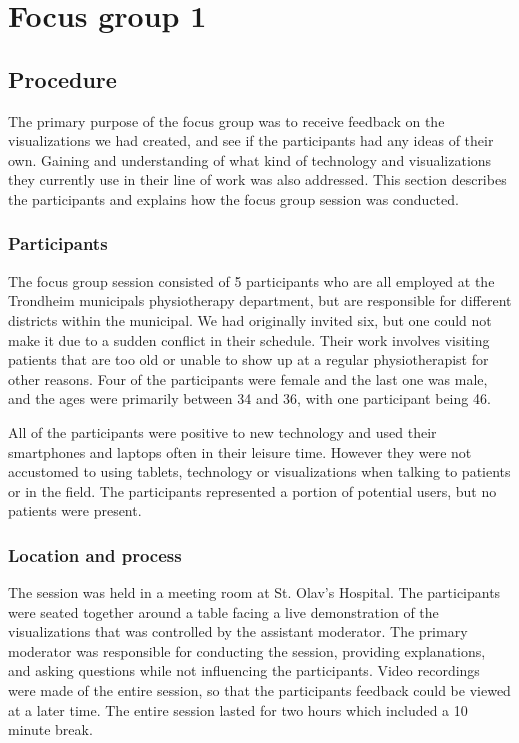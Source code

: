 \chapter{Focus group 1}
\label{ch:focusGroup1}

\section{Procedure}
The primary purpose of the focus group was to receive feedback on the visualizations we had created, and see if the participants had any ideas of their own. Gaining and understanding of what kind of technology and visualizations they currently use in their line of work was also addressed. This section describes the participants and explains how the focus group session was conducted.

\subsection{Participants}
The focus group session consisted of 5 participants who are all employed at the Trondheim municipals physiotherapy department, but are responsible for different districts within the municipal. We had originally invited six, but one could not make it due to a sudden conflict in their schedule. Their work involves visiting patients that are too old or unable to show up at a regular physiotherapist for other reasons. Four of the participants were female and the last one was male, and the ages were primarily between 34 and 36, with one participant being 46. 

All of the participants were positive to new technology and used their smartphones and laptops often in their leisure time. However they were not accustomed to using tablets, technology or visualizations when talking to patients or in the field. The participants represented a portion of potential users, but no patients were present.

\subsection{Location and process}
The session was held in a meeting room at St. Olav's Hospital. The participants were seated together around a table facing a live demonstration of the visualizations that was controlled by the assistant moderator. The primary moderator was responsible for conducting the session, providing explanations, and asking questions while not influencing the participants. Video recordings were made of the entire session, so that the participants feedback could be viewed at a later time. The entire session lasted for two hours which included a 10 minute break.

